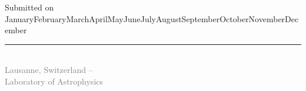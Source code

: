 \begin{titlepage}
\begin{otherlanguage}{french}
\begin{center}
		{\small \sffamily 
		Submitted on \number\day\space\ifcase\month\or January\or February\or March\or April\or May\or June\or July\or August\or September\or October\or November\or December\fi\space\the\year\\[2pt]
		}
	\end{center}
	
	\vfill
	
	\begin{center}
		{\footnotesize \sffamily \textcolor{gray}{
		\rule{\textwidth}{1pt}\\[10pt]
		Lausanne, Switzerland -- \the\year\\
		Laboratory of Astrophysics\\
		}}
	\end{center}
	
	\vspace{1.5cm}
	
	\end{otherlanguage}
\end{titlepage}



